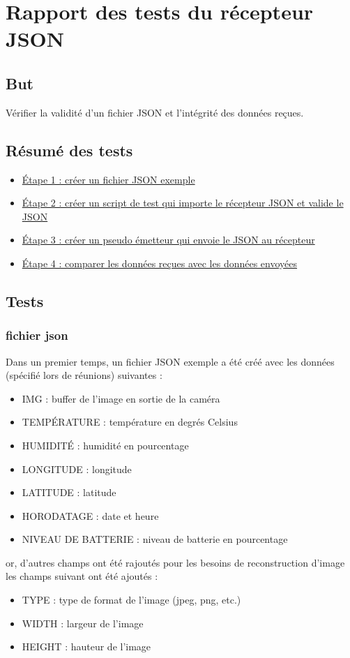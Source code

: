 \section{Rapport des tests du récepteur JSON}

\subsection{But}
Vérifier la validité d'un fichier JSON et l'intégrité des données reçues.

\subsection{Résumé des tests}
\begin{itemize}
  \item \hyperref[sec:json_example]{Étape 1 : créer un fichier JSON exemple}
  \item \hyperref[sec:json_receiver_code]{Étape 2 : créer un script de test qui importe le récepteur JSON et valide le JSON}
  \item \hyperref[sec:json_sender_code]{Étape 3 : créer un pseudo émetteur qui envoie le JSON au récepteur}
  \item \hyperref[sec:json_compare]{Étape 4 : comparer les données reçues avec les données envoyées}
\end{itemize}

\subsection{Tests}

\subsubsection{fichier json}
\label{sec:json_example}

Dans un premier temps, un fichier JSON exemple a été créé avec les données (spécifié lors de réunions) suivantes :
\begin{itemize}
    \item IMG : buffer de l'image en sortie de la caméra
    \item TEMPÉRATURE : température en degrés Celsius
    \item HUMIDITÉ : humidité en pourcentage
    \item LONGITUDE : longitude
    \item LATITUDE : latitude
    \item HORODATAGE : date et heure
    \item NIVEAU DE BATTERIE : niveau de batterie en pourcentage
\end{itemize}
or, d'autres champs ont été rajoutés pour les besoins de reconstruction d'image
les champs suivant ont été ajoutés :
\begin{itemize}
    \item TYPE : type de format de l'image (jpeg, png, etc.)
    \item WIDTH : largeur de l'image
    \item HEIGHT : hauteur de l'image
\end{itemize}

